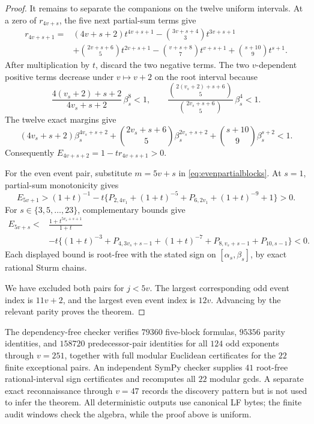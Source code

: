 \documentclass[11pt]{article}
\theoremstyle{remark}
\numberwithin{equation}{section}
\begin{document}
\begin{proof}
It remains to separate the companions on the twelve uniform intervals.  At a
zero of $r_{4v+s}$, the five next partial-sum terms give
\begin{align*}
 r_{4v+s+1}={}&(4v+s+2)t^{4v+s+1}
 -{3v+s+4\choose3}t^{3v+s+1}\\
 &+{2v+s+6\choose5}t^{2v+s+1}
 -{v+s+8\choose7}t^{v+s+1}
 +{s+10\choose9}t^{s+1}.
\end{align*}
After multiplication by $t$, discard the two negative terms.  The two
$v$-dependent positive terms decrease under $v\mapsto v+2$ on the root
interval because
\[
 \frac{4(v_s+2)+s+2}{4v_s+s+2}\,\beta_s^8<1,\qquad
 \frac{{2(v_s+2)+s+6\choose5}}{{2v_s+s+6\choose5}}\,\beta_s^4<1.
\]
The twelve exact margins give
\[
 (4v_s+s+2)\beta_s^{4v_s+s+2}
 +{2v_s+s+6\choose5}\beta_s^{2v_s+s+2}
 +{s+10\choose9}\beta_s^{s+2}<1.
\]
Consequently $E_{4v+s+2}=1-tr_{4v+s+1}>0$.

For the even event pair, substitute $m=5v+s$ in
\eqref{eq:evenpartialblocks}.  At $s=1$, partial-sum monotonicity gives
\[
 E_{5v+1}>(1+t)^{-1}
 -t\{P_{2,4v_1}+(1+t)^{-5}+P_{6,2v_1}+(1+t)^{-9}+1\}>0.
\]
For $s\in\{3,5,\ldots,23\}$, complementary bounds give
\begin{align*}
 E_{5v+s}<{}&\frac{1+t^{5v_s+s+1}}{1+t}\\
 &-t\{(1+t)^{-3}+P_{4,3v_s+s-1}+(1+t)^{-7}
             +P_{8,v_s+s-1}+P_{10,s-1}\}<0.
\end{align*}
Each displayed bound is root-free with the stated sign on
$[\alpha_s,\beta_s]$, by exact rational Sturm chains.

We have excluded both pairs for $j<5v$.  The largest corresponding odd event
index is $11v+2$, and the largest even event index is $12v$.  Advancing by
the relevant parity proves the theorem.
\end{proof}

The dependency-free checker verifies $79360$ five-block formulas, $95356$
parity identities, and $158720$ predecessor-pair identities for all $124$
odd exponents through $v=251$, together with full modular Euclidean
certificates for the $22$ finite exceptional pairs.  An independent SymPy
checker supplies $41$ root-free rational-interval sign certificates and
recomputes all $22$ modular gcds.  A separate exact reconnaissance through
$v=47$ records the discovery pattern but is not used to infer the theorem.
All deterministic outputs use canonical LF bytes; the finite audit windows
check the algebra, while the proof above is uniform.
\end{document}
